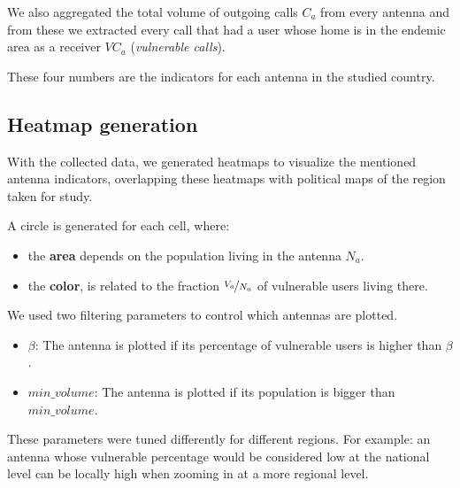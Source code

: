     We also aggregated the total volume of outgoing calls $C_a$ from every antenna and from these we extracted every call that had a user whose home is in the endemic area as a receiver $VC_a$ (\textit{vulnerable calls}).
    
    These four numbers are the indicators for each antenna in the studied country.

\subsection{Heatmap generation}
    With the collected data, we generated heatmaps to visualize the mentioned antenna indicators, overlapping these heatmaps with political maps of the region taken for study.
    
	A circle is generated for each cell, where:
	\begin{itemize}
		\item the \textbf{area} depends on the population living in the antenna $N_a$.
		\item the \textbf{color}, is related to the fraction $\nicefrac{V_a}{N_a}$ of vulnerable users living there.
	\end{itemize}
    
    We used two filtering parameters to control which antennas are plotted.
    \begin{itemize}
        \item $\beta$: The antenna is plotted if its percentage of vulnerable users is higher than $\beta$.
        \item $min\_volume$: The antenna is plotted if its population is bigger than $min\_volume$.
    \end{itemize}
    
    These parameters were tuned differently for different regions. For example: an antenna whose vulnerable percentage would be considered low at the national level can be locally high when zooming in at a more regional level.
    